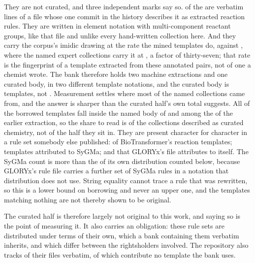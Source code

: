 \documentclass[journal=jcisd8,manuscript=suppinfo,layout=onecolumn]{achemso}
\begin{document}
They are not curated, and three independent marks say so. \numAttribPlaced{} of the
\numAttribUnattributed{} are verbatim lines of a file whose one commit in the history describes
it as extracted reaction rules. They are written in element notation with multi-component
reactant groups, like that file and unlike every hand-written collection here. And they carry the
corpus's imidic drawing at the rate the mined templates do, \numAttribUnattributedimidic{}
against \numAttribMinedimidic{}, where the named expert collections carry it at
\numAttribNamedimidic{}, a factor of thirty-seven; that rate is the fingerprint of a template
extracted from these annotated pairs, not of one a chemist wrote.
The bank therefore holds two machine extractions and one curated body, in two different template
notations, and the curated body is \numAttribNamed{} templates, not \numCuratedTotal{}.
Measurement settles where most of the named collections came from, and the answer is sharper
than the curated half's own total suggests. All
\numThirdpartyInnamed{} of the borrowed templates fall inside the named body of
\numThirdpartyNamed{} and \numThirdpartyInextractionWord{} among the
\numAttribUnattributed{} of the earlier extraction, so the share to read is
\numThirdpartyNamedsharePct{} of the collections described as curated chemistry, not
\numThirdpartyTraceablesharePct{} of the half they sit in. They are present character for
character in a rule set somebody else published: \numThirdpartyBiotransformerShipped{} of
BioTransformer's \numThirdpartyBiotransformerRead{} reaction templates;
\numThirdpartySygmaShipped{} templates attributed to SyGMa; and
\numThirdpartyGloryxShipped{} that GLORYx's file attributes to itself. The SyGMa count is more
than the \numSygmaInside{} of its own distribution counted below, because GLORYx's rule file
carries a further set of SyGMa rules in a notation that distribution does not use. String equality
cannot trace a rule that was rewritten, so this is a lower bound on borrowing and never an upper
one, and the \numThirdpartyUntraceable{} templates matching nothing are not thereby shown to be
original.

The curated half is therefore largely not original to this work, and saying so is the point of
measuring it. It also carries an obligation: these rule sets are distributed under terms of their
own, which a bank containing them verbatim inherits, and which differ between the
\numThirdpartyHoldersWord{} rightsholders involved. The repository also tracks
\numThirdpartyFilesWord{} of their files verbatim, \numThirdpartyFilesunusedWord{} of which
contribute no template the bank uses.
\end{document}
